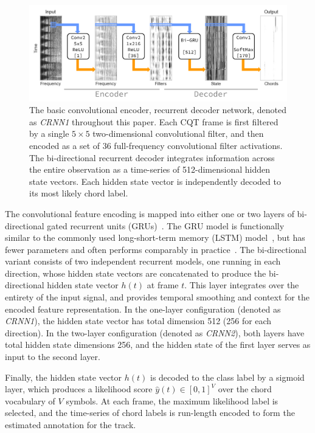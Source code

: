 \documentclass{article}
\begin{document}
\begin{figure}
    \centering
    \includegraphics[width=\columnwidth]{crnn1}
    \caption{The basic convolutional encoder, recurrent decoder network, denoted as \emph{CRNN1} throughout this paper.
            Each CQT frame is first filtered by a single $5\times 5$ two-dimensional convolutional filter, and then encoded as a set of 36 full-frequency convolutional filter activations.  The bi-directional recurrent decoder integrates information across the entire observation as a time-series of 512-dimensional hidden state vectors.  Each hidden state vector is independently decoded to its most likely chord label.\label{fig:crnn1}}
\end{figure}


The convolutional feature encoding is mapped into either one or two layers of bi-directional gated recurrent units (GRUs)~\cite{cho2014learning}.
The GRU model is functionally similar to the commonly used long-short-term memory (LSTM) model~\cite{hochreiter1997long}, but has fewer parameters and often performs comparably in practice~\cite{jozefowicz2015empirical}.
The bi-directional variant consists of two independent recurrent models, one running in each direction, whose hidden state vectors are concatenated to produce the bi-directional hidden state vector $h(t)$ at frame $t$.
This layer integrates over the entirety of the input signal, and provides temporal smoothing and context for the encoded feature representation.
In the one-layer configuration (denoted as \emph{CRNN1}), the hidden state vector has total dimension 512 (256 for each direction).
In the two-layer configuration (denoted as \emph{CRNN2}), both layers have total hidden state dimensions 256, and the hidden state of the first layer serves as input to the second layer.


Finally, the hidden state vector $h(t)$ is decoded to the class label by a sigmoid layer, which produces a likelihood score $\hat{y}(t) \in [0, 1]^{V}$ over the chord vocabulary of $V$ symbols.
At each frame, the maximum likelihood label is selected, and the time-series of chord labels is run-length encoded to form the estimated annotation for the track.
\end{document}

